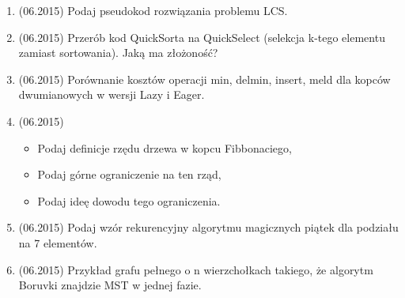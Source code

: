 \documentclass[10pt]{article}%
\begin{document}
\begin{enumerate}
\item (06.2015) Podaj pseudokod rozwiązania problemu LCS.
\item (06.2015) Przerób kod QuickSorta na QuickSelect (selekcja k-tego elementu zamiast sortowania). Jaką ma złożoność?
\item (06.2015) Porównanie kosztów operacji { min, delmin, insert, meld } dla kopców dwumianowych w wersji Lazy i Eager.
\item (06.2015) 
\begin{itemize}
\item Podaj definicje rzędu drzewa w kopcu Fibbonaciego, 
\item Podaj górne ograniczenie na ten rząd, 
\item Podaj ideę dowodu tego ograniczenia. 
\end{itemize}
\item (06.2015) Podaj wzór rekurencyjny algorytmu magicznych piątek dla podziału na 7 elementów. 
\item (06.2015) Przykład grafu pełnego o n wierzchołkach takiego, że algorytm Boruvki znajdzie MST w jednej fazie.
\end{enumerate}
\end{document}
